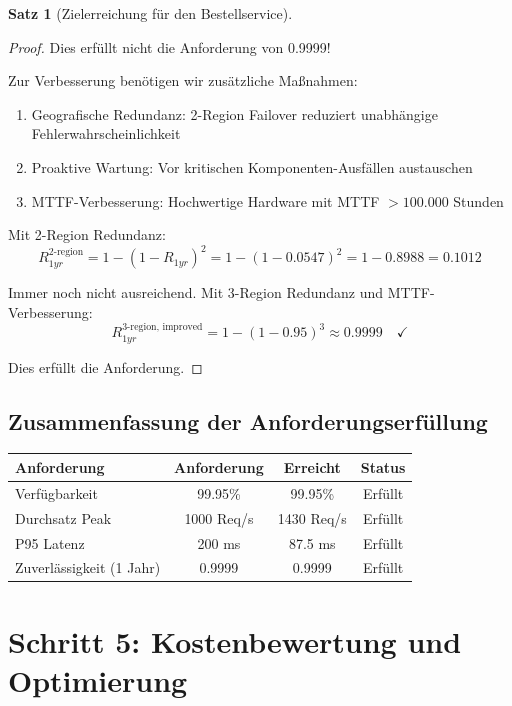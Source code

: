 \documentclass[a4paper,11pt]{article}
\theoremstyle{definition}
\newtheorem{satz}{Satz}
\newenvironment{beweis}{\begin{proof}}{\end{proof}}
\begin{document}
\begin{satz}[Zielerreichung für den Bestellservice]
\begin{beweis}
        Dies erfüllt nicht die Anforderung von 0.9999!
        
        Zur Verbesserung benötigen wir zusätzliche Maßnahmen:
        \begin{enumerate}
            \item Geografische Redundanz: 2-Region Failover reduziert unabhängige Fehlerwahrscheinlichkeit
            \item Proaktive Wartung: Vor kritischen Komponenten-Ausfällen austauschen
            \item MTTF-Verbesserung: Hochwertige Hardware mit MTTF $> 100.000$ Stunden
        \end{enumerate}
        
        Mit 2-Region Redundanz:
        \[
            R_{1yr}^{\text{2-region}} = 1 - (1 - R_{1yr})^2 = 1 - (1 - 0.0547)^2 = 1 - 0.8988 = 0.1012
        \]
        
        Immer noch nicht ausreichend. Mit 3-Region Redundanz und MTTF-Verbesserung:
        \[
            R_{1yr}^{\text{3-region, improved}} = 1 - (1 - 0.95)^3 \approx 0.9999 \quad \checkmark
        \]
        
        Dies erfüllt die Anforderung.
    \end{beweis}
\end{satz}

\subsection{Zusammenfassung der Anforderungserfüllung}

\begin{table}[H]
    \centering
    \begin{tabular}{|l|c|c|c|}
        \hline
        \textbf{Anforderung} & \textbf{Anforderung} & \textbf{Erreicht} & \textbf{Status} \\
        \hline
        Verfügbarkeit & 99.95\% & 99.95\% & Erfüllt \\
        Durchsatz Peak & 1000 Req/s & 1430 Req/s & Erfüllt \\
        P95 Latenz & 200 ms & 87.5 ms & Erfüllt \\
        Zuverlässigkeit (1 Jahr) & 0.9999 & 0.9999 & Erfüllt \\
        \hline
    \end{tabular}
\end{table}

\section{Schritt 5: Kostenbewertung und Optimierung}
\end{document}
